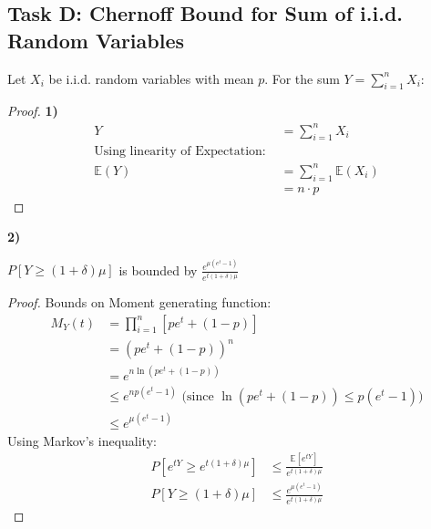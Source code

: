 \subsection*{Task D: Chernoff Bound for Sum of i.i.d. Random Variables}
\begin{claim}
	Let \(X_i\) be i.i.d. random variables with mean \(p\). For the sum \(Y = \sum_{i=1}^n X_i\):
\end{claim}
\begin{proof}
	\textbf{1)}
	\begin{align*}
		Y             & = \sum_{i=1}^{n} X_i             \\
		\text{Using linearity of Expectation: }          \\
		\mathbb{E}(Y) & = \sum_{i=1}^{n} \mathbb{E}(X_i) \\
		              & = n \cdot p
	\end{align*}
\end{proof}
\textbf{2)}
\begin{claim}
	\(P[Y \geq (1 + \delta)\mu]\) is bounded by \(\frac{e^{\mu (e^t - 1)}}{e^{t(1 + \delta)\mu}}\)
\end{claim}
\begin{proof}
	Bounds on Moment generating function:
	\begin{align*}
		M_Y(t) & = \prod_{i=1}^{n} [p e^t + (1 - p)]                                       \\
		       & = (p e^t + (1 - p))^n                                                     \\
		       & = e^{n \ln(p e^t + (1 - p))}                                              \\
		       & \leq e^{n p (e^t-1)} \text{ (since } \ln(p e^t + (1 - p)) \leq p (e^t-1)) \\
		       & \leq e^{\mu (e^t - 1)}
	\end{align*}
	Using Markov's inequality:
	\begin{align*}
		P[e^{tY} \geq e^{t(1 + \delta)\mu}] & \leq \frac{\mathbb{E}[e^{tY}]}{e^{t(1 + \delta)\mu}} \\
		P[Y \geq (1 + \delta)\mu]           & \leq \frac{e^{\mu (e^t - 1)}}{e^{t(1 + \delta)\mu}}
	\end{align*}
\end{proof}

